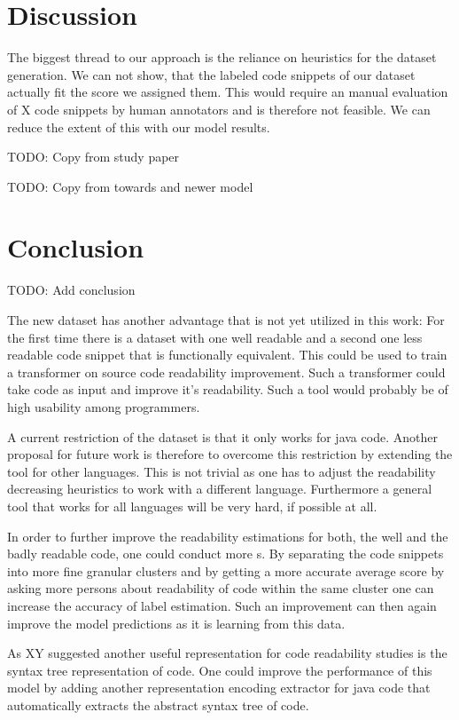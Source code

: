 \documentclass[%
class=scrreprt,
chapterprefix=false,%
open=right,%
twoside=false,%
paper=a4,%
logofile={Logo\_zentral\_farbig\_EN.png},%
thesistype=master,%
UKenglish,%
]{se2thesis}
\begin{document}
	\section{Discussion} \label{Discussion}
	The biggest thread to our approach is the reliance on heuristics for the dataset generation. We can not show, that the labeled code snippets of our dataset actually fit the score we assigned them. This would require an manual evaluation of X code snippets by human annotators and is therefore not feasible. We can reduce the extent of this with our model results. 
	
	TODO: Copy from study paper
	
	TODO: Copy from towards and newer model
		
	
	\section{Conclusion} \label{Conclusion}
	TODO: Add conclusion
	
	The new dataset has another advantage that is not yet utilized in this work: For the first time there is a dataset with one well readable and a second one less readable code snippet that is functionally equivalent. This could be used to train a transformer on source code readability improvement. Such a transformer could take code as input and improve it's readability. Such a tool would probably be of high usability among programmers.
	
	A current restriction of the dataset is that it only works for java code. Another proposal for future work is therefore to overcome this restriction by extending the tool for other languages. This is not trivial as one has to adjust the readability decreasing heuristics to work with a different language. Furthermore a general tool that works for all languages will be very hard, if possible at all.
	
	In order to further improve the readability estimations for both, the well and the badly readable code, one could conduct more s. By separating the code snippets into more fine granular clusters and by getting a more accurate average score by asking more persons about readability of code within the same cluster one can increase the accuracy of label estimation. Such an improvement can then again improve the model predictions as it is learning from this data.
	
	As XY suggested another useful representation for code readability studies is the syntax tree representation of code. One could improve the performance of this model by adding another representation encoding extractor for java code that automatically extracts the abstract syntax tree of code. 
	
\end{document}
